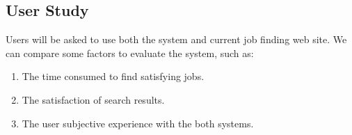 \subsection{User Study}
Users will be asked to use both the system and current job finding web site. We can compare some factors to evaluate the system, such as:
\begin{enumerate}
    \item The time consumed to find satisfying jobs.
    \item The satisfaction of search results.
    \item The user subjective experience with the both systems.
\end{enumerate}
